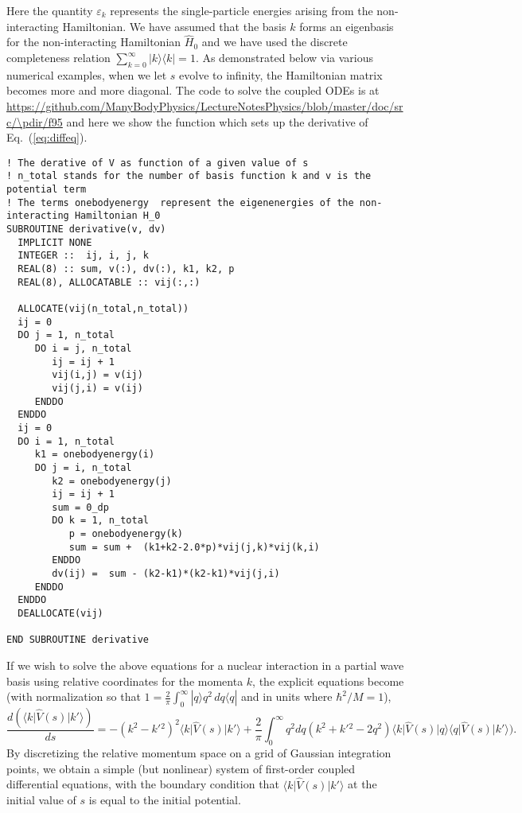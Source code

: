 Here the quantity $\varepsilon_k$ represents the single-particle
energies arising from the non-interacting Hamiltonian. We have assumed
that the basis $k$ forms an eigenbasis for the non-interacting
Hamiltonian $\hat{H}_0$ and we have used the discrete completeness
relation $\sum_{k=0}^{\infty}\vert k \rangle \langle k \vert = 1$.  As
demonstrated below via various numerical examples, when we let $s$
evolve to infinity, the Hamiltonian matrix becomes more and more
diagonal. The code to solve the coupled ODEs is at
\url{https://github.com/ManyBodyPhysics/LectureNotesPhysics/blob/master/doc/src/\pdir/f95} and here we show the function which sets up the derivative of Eq.~(\ref{eq:diffeq}). 
\begin{lstlisting}
! The derative of V as function of a given value of s
! n_total stands for the number of basis function k and v is the potential term
! The terms onebodyenergy  represent the eigenenergies of the non-interacting Hamiltonian H_0
SUBROUTINE derivative(v, dv)
  IMPLICIT NONE
  INTEGER ::  ij, i, j, k
  REAL(8) :: sum, v(:), dv(:), k1, k2, p
  REAL(8), ALLOCATABLE :: vij(:,:)

  ALLOCATE(vij(n_total,n_total)) 
  ij = 0
  DO j = 1, n_total
     DO i = j, n_total
        ij = ij + 1
        vij(i,j) = v(ij)
        vij(j,i) = v(ij)
     ENDDO
  ENDDO
  ij = 0
  DO i = 1, n_total
     k1 = onebodyenergy(i) 
     DO j = i, n_total
        k2 = onebodyenergy(j) 
        ij = ij + 1
        sum = 0_dp
        DO k = 1, n_total
           p = onebodyenergy(k) 
           sum = sum +  (k1+k2-2.0*p)*vij(j,k)*vij(k,i) 
        ENDDO
        dv(ij) =  sum - (k2-k1)*(k2-k1)*vij(j,i)
     ENDDO
  ENDDO
  DEALLOCATE(vij)

END SUBROUTINE derivative
\end{lstlisting}

If we wish to solve the above equations for a nuclear interaction in a
partial wave basis using relative coordinates for the momenta $k$, the explicit equations
become \cite{Bogner:2007od} (with normalization
so that $1 = \frac{2}{\pi}\int_0^\infty|q\rangle q^2\,dq \langle q |$
and in units where $\hbar^2/M = 1$),
%
\begin{equation}
  \frac{d(\langle k \vert \hat{V}(s) \vert k'\rangle)}{ds} =- (k^2 - k'{}^2)^2\langle k \vert \hat{V}(s) \vert k'\rangle
    + \frac{2}{\pi}\int_0^{\infty}q^2dq
      (k^2 + k'{}^2 - 2q^2)\langle k \vert \hat{V}(s) \vert q\rangle\langle q \vert \hat{V}(s) \vert k'\rangle).
\end{equation}
By discretizing the relative momentum space on a grid of Gaussian integration points, 
we obtain a simple (but nonlinear) system of first-order
coupled differential equations,
with the boundary condition that $\langle k \vert \hat{V}(s) \vert k'\rangle$ at the initial
value of $s$ is equal to the initial potential.

